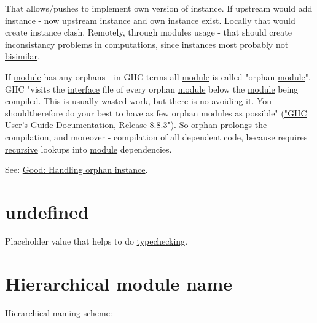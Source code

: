 \documentclass[a4paper,14pt,oneside]{book}
\begin{document}
That allows/pushes to implement own version of instance. If upstream would add instance - now upstream instance and own instance exist. Locally that would create instance clash. Remotely, through modules usage - that should create inconsistancy problems in computations, since instances most probably not \hyperref[org29cdfed]{bisimilar}.

If \hyperref[orge2c48bf]{module} has any orphans - in GHC terms all \hyperref[orge2c48bf]{module} is called "orphan \hyperref[orge2c48bf]{module}". GHC "visits the \hyperref[orgae53052]{interface} file of every orphan \hyperref[orge2c48bf]{module} below the \hyperref[orge2c48bf]{module} being compiled. This is usually wasted work, but there is no avoiding it. You shouldtherefore do your best to have as few orphan modules as possible" (\href{https://downloads.haskell.org/\~ghc/latest/docs/users\_guide.pdf}{"GHC User’s Guide Documentation, Release 8.8.3"}). So orphan prolongs the compilation, and moreover - compilation of all dependent code, because requires \hyperref[orge823d21]{recursive} lookups into \hyperref[orge2c48bf]{module} dependencies.

See: \hyperref[org4732b6f]{Good: Handling orphan instance}.

\section{\label{org34c4ca9}undefined}
\label{sec:org33a535f}
Placeholder value that helps to do \hyperref[orgd78825c]{typechecking}.

\section{\label{org858b57a}Hierarchical module name}
\label{sec:orge9ab021}
Hierarchical naming scheme:
\end{document}
